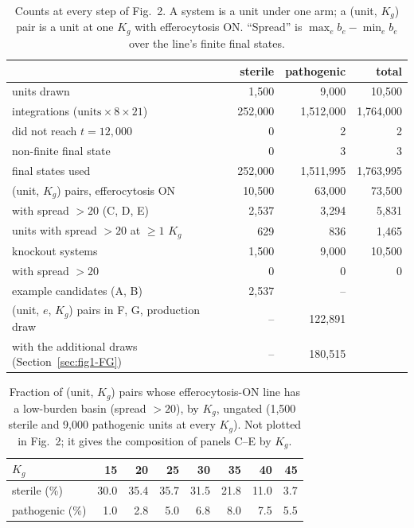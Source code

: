 \documentclass[11pt]{article}
\begin{document}
\begin{table}[H]
\centering
\caption{Counts at every step of Fig.~2. A system is a unit under one arm; a
(unit, $K_g$) pair is a unit at one $K_g$ with efferocytosis ON. ``Spread'' is
$\max_e b_e - \min_e b_e$ over the line's finite final states.}
\label{tab:fig01-counts}
\begin{tabular}{lrrr}
\toprule
 & sterile & pathogenic & total \\
\midrule
units drawn & 1{,}500 & 9{,}000 & 10{,}500 \\
integrations ($\text{units}\times 8\times 21$) & 252{,}000 & 1{,}512{,}000 & 1{,}764{,}000 \\
\quad did not reach $t = 12{,}000$ & 0 & 2 & 2 \\
\quad non-finite final state & 0 & 3 & 3 \\
final states used & 252{,}000 & 1{,}511{,}995 & 1{,}763{,}995 \\
(unit, $K_g$) pairs, efferocytosis ON & 10{,}500 & 63{,}000 & 73{,}500 \\
\quad with spread $> 20$ (C, D, E) & 2{,}537 & 3{,}294 & 5{,}831 \\
\quad units with spread $> 20$ at $\geq 1$ $K_g$ & 629 & 836 & 1{,}465 \\
knockout systems & 1{,}500 & 9{,}000 & 10{,}500 \\
\quad with spread $> 20$ & 0 & 0 & 0 \\
example candidates (A, B) & 2{,}537 & -- & \\
(unit, $e$, $K_g$) pairs in F, G, production draw & -- & 122{,}891 & \\
\quad with the additional draws (Section~\ref{sec:fig1-FG}) & -- & 180{,}515 & \\
\bottomrule
\end{tabular}
\end{table}

\begin{table}[H]
\centering
\caption{Fraction of (unit, $K_g$) pairs whose efferocytosis-ON line has a low-burden basin (spread $> 20$), by
$K_g$, ungated (1{,}500 sterile and 9{,}000 pathogenic units at every $K_g$). Not
plotted in Fig.~2; it gives the composition of panels C--E by $K_g$.}
\label{tab:fig01-kg}
\begin{tabular}{lrrrrrrr}
\toprule
$K_g$ & 15 & 20 & 25 & 30 & 35 & 40 & 45 \\
\midrule
sterile (\%)    & 30.0 & 35.4 & 35.7 & 31.5 & 21.8 & 11.0 & 3.7 \\
pathogenic (\%) & 1.0 & 2.8 & 5.0 & 6.8 & 8.0 & 7.5 & 5.5 \\
\bottomrule
\end{tabular}
\end{table}
\end{document}
